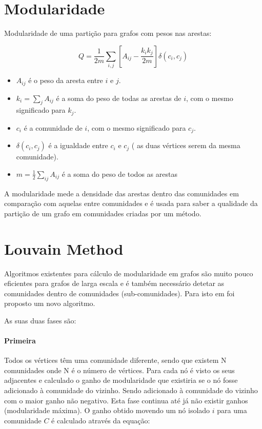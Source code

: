 \documentclass[a4paper,10pt]{report}
\begin{document}
\section*{Modularidade}

Modularidade de uma partição para grafos com pesos nas arestas:

\begin{equation}
Q = \frac{1}{2m} \sum_{i,j} [ A_{ij} - \frac{k_i k_j}{2m} ] \delta(c_i ,c_j)
\label{eq:MN}
\end{equation}


\begin{itemize}
	\item $A_{ij}$ é o peso da aresta entre $i$ e $j$.
	\item $k_i = \sum_j A_{ij}$ é a soma do peso de todas as arestas de $i$, com o mesmo significado para $k_j$.
	\item $c_i$ é a comunidade de $i$, com o mesmo significado para $c_j$.
	\item $\delta(c_i,c_j)$ é a igualdade entre $c_i$ e $c_j$ ( as duas vértices serem da mesma comunidade).
	\item $m = \frac{1}{2}\sum_{ij} A_{ij}$ é a soma do peso de todos as arestas %
\end{itemize}

A modularidade mede a densidade das arestas dentro das comunidades em comparação com aquelas entre comunidades e é usada para saber a qualidade da partição de um grafo em comunidades criadas por um método. 


\section*{Louvain Method}
Algoritmos existentes para cálculo de modularidade em grafos são muito pouco eficientes para grafos de larga escala e é também necessário detetar as comunidades dentro de comunidades (sub-comunidades). Para isto em \cite{louvainDoc} foi proposto um novo algoritmo.

As suas duas fases são:

\paragraph{Primeira}
Todos os vértices têm uma comunidade diferente, sendo que existem N comunidades onde N é o número de vértices.
Para cada nó é visto os seus adjacentes e calculado o ganho de modularidade que existiria se o nó fosse adicionado à comunidade do vizinho. Sendo adicionado à comunidade do vizinho com o maior ganho não negativo. Esta fase continua até já não existir ganhos (modularidade máxima).
O ganho obtido movendo um nó isolado $i$ para uma comunidade $C$ é calculado através da equação:
\end{document}
